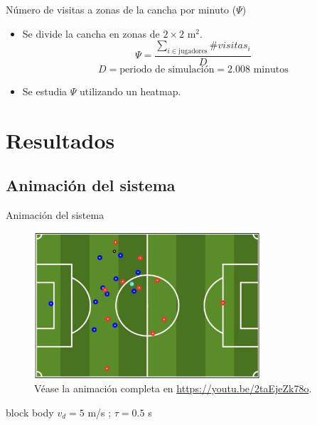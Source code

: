 \documentclass{beamer}
\begin{document}
            \begin{frame}{Número de visitas a zonas de la cancha por minuto ($\Psi$)}
                \begin{itemize}
                    \item Se divide la cancha en zonas de $2 \times 2 \text{ m}^2$.
                    \begin{equation*}
                        \Psi = \frac{\sum_{i \in \text{jugadores}} \#visitas_i}{D}
                    \end{equation*}
                    \begin{equation*}
                        D = \text{periodo de simulación} = 2.008 \text{ minutos}
                    \end{equation*}
                    \item Se estudia $\Psi$ utilizando un \alert{heatmap}.
                \end{itemize}
            \end{frame}

    \section{Resultados}

        \subsection{Animación del sistema}

            \begin{frame}{Animación del sistema}{}
                \vspace*{-0.3cm}
                \begin{figure}[H!]
                    \includegraphics[width=0.75\textwidth]{./animacion_1}
                    \caption*{Véase la animación completa en \url{https://youtu.be/2taEjeZk78o}.}
                    \label{fig:futbol_1}
                \end{figure}
                \vspace*{-0.5cm}
                \begin{beamercolorbox}[sep=5pt,center]{block body}
                    \centering
                    \small{$v_d = 5$ m/s ; $\tau = 0.5$ s}
                \end{beamercolorbox}
            \end{frame}
\end{document}
